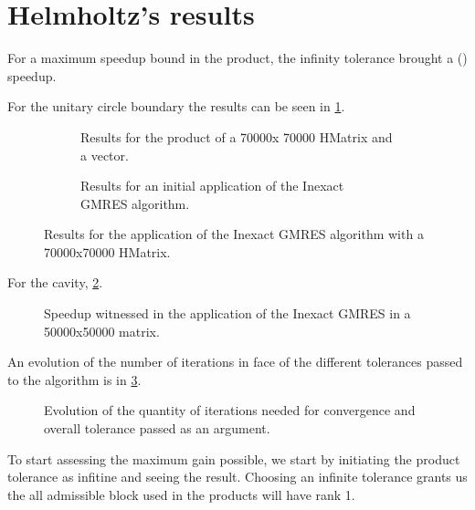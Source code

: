 \section{Helmholtz's results}

For a maximum speedup bound in the product, the infinity tolerance brought a () speedup.

For the unitary circle boundary the results can be seen in \ref{fig:Helmholtz_circle_results}.

\begin{figure}[h!]
    \centering
    \begin{subfigure}[b]{0.45\linewidth}
        
        \caption{Results for the product of a 70000x 70000 HMatrix and a vector.}
    \end{subfigure}
    \begin{subfigure}[b]{0.45\linewidth}
        
        \caption{Results for an initial application of the Inexact GMRES algorithm.}
    \end{subfigure}
    \caption{Results for the application of the Inexact GMRES algorithm with a 70000x70000 HMatrix.}
    \label{fig:Helmholtz_circle_results}
\end{figure}


For the cavity, \ref{fig:cavity_results}.

\begin{figure}[h!]
    \centering
    
    \caption{Speedup witnessed in the application of the Inexact GMRES in a 50000x50000 matrix.}
    \label{fig:cavity_results}
\end{figure}

An evolution of the number of iterations in face of the different tolerances passed to the algorithm is in \ref{fig:cavity_iterations}.

\begin{figure}[h!]
    \centering
    
    \caption{Evolution of the quantity of iterations needed for convergence and overall tolerance passed as an argument.}
    \label{fig:cavity_iterations}
\end{figure}



To start assessing the maximum gain possible, we start by initiating the product tolerance as infitine and seeing the result. Choosing an infinite tolerance grants us the all admissible block used in the products will have rank 1.


